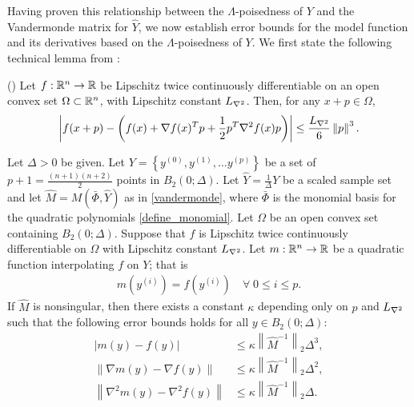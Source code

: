 \documentclass{article}
\newcommand{\real}{\mathbb R}
\begin{document}
Having proven this relationship between the $\Lambda$-poisedness of $Y$ and the Vandermonde matrix for $\hat{Y}$,  we now establish error bounds for the model function and its derivatives based on the $\Lambda$-poisedness of $Y$.   We first state the following technical lemma from \cite{dennisschnabel1983}:
\begin{lemma}(\cite[Lemma 4.1.14]{dennisschnabel1983})
\label{4_1_14}
Let $f : \mathbb R^n \to \mathbb R$ be Lipschitz twice continuously differentiable on an open convex set $\Omega \subset \mathbb R^n$,
with Lipschitz constant ${L_{\nabla^2}}$.
Then, for any $x + p\in \Omega$,
\begin{align*}
\left|f(x + p) - \left(f(x) + \nabla f(x)^T p + \frac 1 2 p^T \nabla^2 f(x)p\right) \right|
\le \frac {{L_{\nabla^2}}} 6 \left\|p\right\|^3.
\end{align*}
\end{lemma}
\begin{theorem}
\label{3_16_replacement2}
Let  $\Delta>0$  be given.
Let $Y = \left\{y^{(0)}, y^{(1)}, \ldots y^{(p)} \right\}$ be a set of $p+1=\frac{(n+1)(n+2)}{2}$ points in $B_2\left(0;\Delta\right)$.
Let  $\hat{Y}=\frac{1}{\Delta} Y$ be a scaled sample set and let $\hat{M} = M(\bar \Phi,\hat{Y})$ as in \cref{vandermonde},
where $\bar \Phi$ is the monomial basis for the quadratic polynomials \cref{define_monomial}.
Let $\Omega$ be an open convex set containing $B_2(0;\Delta)$.
Suppose that $f$ is Lipschitz twice continuously differentiable on $\Omega$ with Lipschitz constant ${L_{\nabla^2}}$.
Let $m: \Rn \rightarrow \real$ be a quadratic function interpolating $f$ on $Y$; that is 
\begin{align}
m\left(y^{(i)}\right) = f\left(y^{(i)}\right) \quad \forall \; 0 \le i \le p. \label{nce_interpolation_condition}
\end{align}
If $\hat{M}$ is nonsingular, then there exists a constant $\kappa$ depending only on $p$ and ${L_{\nabla^2}}$ such that the following error bounds holds for all $y \in B_2\left(0; \Delta\right)$:
\begin{align}
\left|m(y) - f(y)\right| &\le \kappa \left\|\hat M^{-1}\right\|_2 \Delta^3, \label{error_in_function}  \\
\left\|\nabla m(y) - \nabla f(y)\right\| &\le \kappa \left\|\hat M^{-1} \right\|_2\Delta^2, \label{error_in_gradient} \\
\left\|\nabla^2 m(y) - \nabla^2 f(y)\right\| &\le \kappa \left\|\hat M^{-1} \right\|_2\Delta. \label{error_in_hessian}
\end{align}
\end{theorem}
\end{document}
